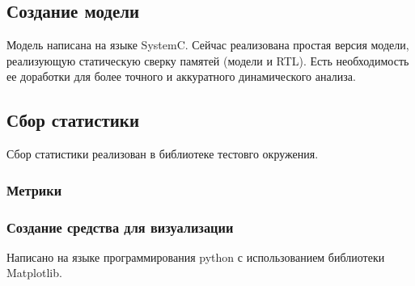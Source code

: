 \subsection{Создание модели}

Модель написана на языке SystemC. Сейчас реализована простая версия модели, реализующую статическую сверку памятей (модели и RTL). Есть необходимость ее доработки для более точного и аккуратного динамического анализа.

\subsection{Сбор статистики}

Сбор статистики реализован в библиотеке тестовго окружения.

\subsubsection{Метрики}

\subsubsection{Создание средства для визуализации}

Написано на языке программирования python с использованием библиотеки Matplotlib.

\clearpage

